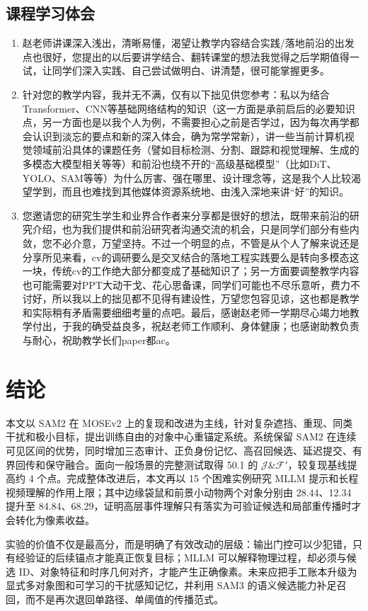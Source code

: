 \documentclass[11pt,a4paper,oneside]{ctexart}
\newcommand{\jf}{\ensuremath{\mathcal{J}\!\&\!\mathcal{F}'}}
\begin{document}
\subsection{课程学习体会}
{\small
\begin{enumerate}[label=\arabic*.,leftmargin=2.2em,itemsep=0.3em]
  \item 赵老师讲课深入浅出，清晰易懂，渴望让教学内容结合实践/落地前沿的出发点也很好，您提出的以后要讲学结合、翻转课堂的想法我觉得之后学期值得一试，让同学们深入实践、自己尝试做明白、讲清楚，很可能掌握更多。
  \item 针对您的教学内容，我并无不满，仅有以下拙见供您参考：私以为结合Transformer、CNN等基础网络结构的知识（这一方面是承前启后的必要知识点，另一方面也是以我个人为例，不需要担心之前是否学过，因为每次再学都会认识到淡忘的要点和新的深入体会，确为常学常新），讲一些当前计算机视觉领域前沿具体的课题任务（譬如目标检测、分割、跟踪和视觉理解、生成的多模态大模型相关等等）和前沿也绕不开的“高级基础模型”（比如DiT、YOLO、SAM等等）为什么厉害、强在哪里、设计理念等，这是我个人比较渴望学到，而且也难找到其他媒体资源系统地、由浅入深地来讲“好”的知识。
  \item 您邀请您的研究生学生和业界合作者来分享都是很好的想法，既带来前沿的研究介绍，也为我们提供和前沿研究者沟通交流的机会，只是同学们部分有些内敛，您不必介意，万望坚持。不过一个明显的点，不管是从个人了解来说还是分享所见来看，cv的调研要么是交叉结合的落地工程实践要么是转向多模态这一块，传统cv的工作绝大部分都变成了基础知识了；另一方面要调整教学内容也可能需要对PPT大动干戈、花心思备课，同学们可能也不尽乐意听，费力不讨好，所以我以上的拙见都不见得有建设性，万望您包容见谅，这也都是教学和实际稍有矛盾需要细细考量的点吧。最后，感谢赵老师一学期尽心竭力地教学付出，于我的确受益良多，祝赵老师工作顺利、身体健康；也感谢助教负责与耐心，祝助教学长们paper都ac。
\end{enumerate}
}

\section{结论}
本文以 SAM2 在 MOSEv2 上的复现和改进为主线，针对复杂遮挡、重现、同类干扰和极小目标，提出训练自由的对象中心重锚定系统。系统保留 SAM2 在连续可见区间的优势，同时增加三态审计、正负身份记忆、高召回候选、延迟提交、有界回传和保守融合。面向一般场景的完整测试取得 50.1 的 \jf{}，较复现基线提高约 4 个点。完成整体改进后，本文再以 15 个困难实例研究 MLLM 提示和长程视频理解的作用上限；其中边缘袋鼠和前景小动物两个对象分别由 28.44、12.34 提升至 84.84、68.29，证明高层事件理解只有落实为可验证候选和局部重传播时才会转化为像素收益。

实验的价值不仅是最高分，而是明确了有效改动的层级：输出门控可以少犯错，只有经验证的后续锚点才能真正恢复目标；MLLM 可以解释物理过程，却必须与候选 ID、对象特征和时序几何对齐，才能产生正确像素。未来应把手工账本升级为显式多对象图和可学习的干扰感知记忆，并利用 SAM3 的语义候选能力补足召回，而不是再次退回单路径、单阈值的传播范式。



\end{document}
